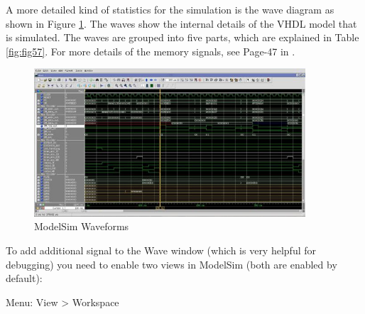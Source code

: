 A more detailed kind of statistics for the simulation is the wave
diagram as shown in Figure \ref{fig:fig56}. The waves
show the internal details of the VHDL model that is simulated. The waves
are grouped into five parts, which are explained in Table \ref{fig:fig57}. For
more details of the memory signals, see Page-47 in \cite{RM}.
\begin{figure}[!htb]
	\centering
	\includegraphics[width=0.9\textwidth]{src/images/5-7.png}
	\caption{ModelSim Waveforms}
	\label{fig:fig56}
\end{figure}
To add additional signal to the Wave window (which is very helpful for
debugging) you need to enable two views in ModelSim (both are enabled by
default):

Menu: View \textgreater{} Workspace

